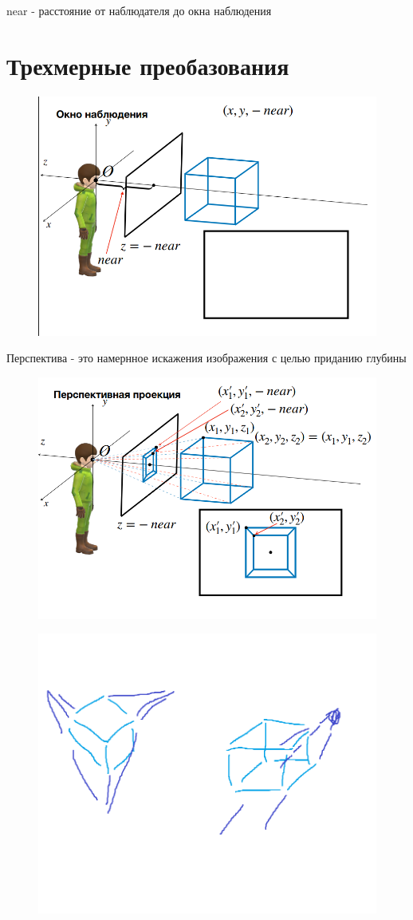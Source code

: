 \documentclass{article}
\begin{document}
near - расстояние от наблюдателя до окна наблюдения

\section{Трехмерные преобазования}

\begin{figure} [H]
    \includegraphics[width=0.70\linewidth]{Снимок экрана 2025-03-31 133559.png}
\end{figure}

Перспектива - это намернное искажения изображения с целью приданию глубины

\begin{figure} [H]
    \includegraphics[width=0.70\linewidth]{Снимок экрана 2025-03-31 133646.png}
\end{figure}



\begin{figure} [H]
    \includegraphics[width=0.70\linewidth]{куб.png}
\end{figure}
\end{document}
